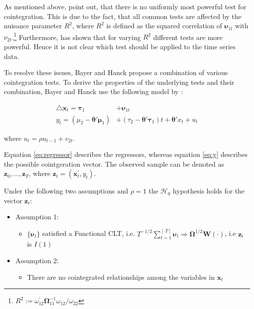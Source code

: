 \documentclass[11pt,a4paper]{article}
\let\rmarkdownfootnote\footnote%
\def\footnote{\protect\rmarkdownfootnote}
\begin{document}
As mentioned above, \textcite{Bayerhanck2009} point out, that there is
no uniformly most powerful test for cointegration. This is due to the
fact, that all common tests are affected by the nuisance parameter
\(R^2\), where \(R^2\) is defined as the squared correlation of
\(\pmb{\nu}_{1t}\) with \(\nu_{2t}\).\footnote{\(R^2:= \omega_{12}^{'} \pmb{\Omega}_{11}^{-1}\omega_{12} / \omega_{22}\)}
Furthermore, \textcite{pesavento2004} has shown that for varying \(R^2\)
different tests are more powerful. Hence it is not clear which test
should be applied to the time series data.

To resolve these issues, Bayer and Hanck propose a combination of
various cointegration tests. To derive the properties of the underlying
tests and their combination, Bayer and Hanck use the following model by
\textcite{pesavento2004}:

\begin{align}
\label{eq:regressor}
\triangle \pmb{x}_t = \pmb{\tau}_1 &+  \pmb{\nu}_{1t}\\
\label{eq:y}
y_t  = \left(\mu_2 - \pmb{\theta}' \pmb{\mu}_1 \right) &+ \left(\tau_2 - \pmb{\theta}' \pmb{\tau}_1 \right)t + \pmb{\theta}' x_t + u_t \nonumber
\end{align}

where \(u_t = \rho u_{t-1} + v_{2t}\).

Equation \eqref{eq:regressor} describes the regressors, whereas equation
\eqref{eq:y} describes the possible cointgeration vector. The observed
sample can be denoted as \(\pmb{z}_0, \ldots , \pmb{z}_T\), where
\(\pmb{z}_t = (\pmb{x}_t^{'}, y_t)\).

Under the following two assumptions and \(\rho = 1\) the
\(\mathcal{H}_0\) hypothesis holds for the vector \(\pmb{z}_t\):

\begin{itemize}
  \item[] Assumption 1: 
  \begin{itemize}
    \item[] $\{ \pmb{\nu}_t \}$ satisfied a Functional CLT, i.e. $\displaystyle T^{-1/2} \sum_{t = 1}^{[\cdot T]} \pmb{\nu}_t \Rightarrow \pmb{\Omega}^{1/2} \pmb{W}(\cdot)$, i.e $\pmb{z}_t$ is $I(1)$  
  \end{itemize}
  \item[] Assumption 2:
  \begin{itemize}
    \item[] There are no cointegrated relationships among the variables in $\pmb{x}_t$
  \end{itemize}
\end{itemize}
\end{document}
